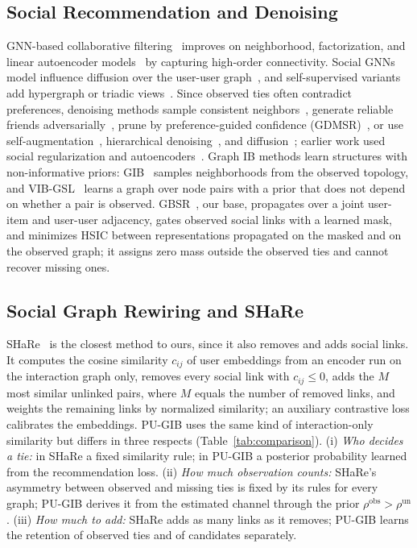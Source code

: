 \documentclass[sigconf]{acmart}
\begin{document}
\subsection{Social Recommendation and Denoising}
GNN-based collaborative filtering~\cite{10.1145/3331184.3331267, 10.1145/3397271.3401063} improves on neighborhood, factorization, and linear autoencoder models~\cite{10.1145/371920.372071, 5197422, 10.1145/3308558.3313710, 10.1145/3523227.3551482} by capturing high-order connectivity. Social GNNs model influence diffusion over the user-user graph~\cite{10.1145/3308558.3313488, 9311623}, and self-supervised variants add hypergraph or triadic views~\cite{yu2021self, yu2021socially}. Since observed ties often contradict preferences, denoising methods sample consistent neighbors~\cite{10.1145/3404835.3463028}, generate reliable friends adversarially~\cite{8970896, 9239885}, prune by preference-guided confidence (GDMSR)~\cite{10.1145/3543507.3583374}, or use self-augmentation~\cite{wang2023denoised}, hierarchical denoising~\cite{10771708}, and diffusion~\cite{10.1145/3696410.3714874}; earlier work used social regularization and autoencoders~\cite{10.1145/1935826.1935877, Pan2017ACD}. Graph IB methods learn structures with non-informative priors: GIB~\cite{wu2020graph} samples neighborhoods from the observed topology, and VIB-GSL~\cite{sun2022vib} learns a graph over node pairs with a prior that does not depend on whether a pair is observed. GBSR~\cite{10.1145/3637528.3671807}, our base, propagates over a joint user-item and user-user adjacency, gates observed social links with a learned mask, and minimizes HSIC between representations propagated on the masked and on the observed graph; it assigns zero mass outside the observed ties and cannot recover missing ones.

\subsection{Social Graph Rewiring and SHaRe}
\label{sec:share}
SHaRe~\cite{10.1145/3589334.3645460} is the closest method to ours, since it also removes and adds social links. It computes the cosine similarity $c_{ij}$ of user embeddings from an encoder run on the interaction graph only, removes every social link with $c_{ij} \le 0$, adds the $M$ most similar unlinked pairs, where $M$ equals the number of removed links, and weights the remaining links by normalized similarity; an auxiliary contrastive loss calibrates the embeddings. PU-GIB uses the same kind of interaction-only similarity but differs in three respects (Table~\ref{tab:comparison}). (i) \emph{Who decides a tie:} in SHaRe a fixed similarity rule; in PU-GIB a posterior probability learned from the recommendation loss. (ii) \emph{How much observation counts:} SHaRe's asymmetry between observed and missing ties is fixed by its rules for every graph; PU-GIB derives it from the estimated channel through the prior $\rho^{\text{obs}} > \rho^{\text{un}}$. (iii) \emph{How much to add:} SHaRe adds as many links as it removes; PU-GIB learns the retention of observed ties and of candidates separately.
\end{document}
